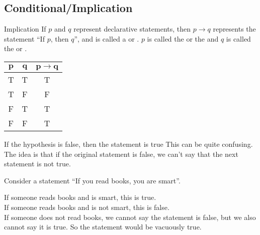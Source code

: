 \documentclass[../notes.tex]{subfiles}
\begin{document}
			\subsection[Conditional]{Conditional/Implication}
				\begin{definition}{Implication}
					If $p$ and $q$ represent declarative statements, then $p \rightarrow q$ represents the statement ``If $p$, then $q$'', and is called a  or . $p$ is called the  or the  and $q$ is called the  or .
				\end{definition}
				\nopagebreak
				\begin{center}
					\begin{tabular}{|c c | c|}
						\hline
						$\mathbf{p}$ & $\mathbf{q}$ & $\mathbf{p \rightarrow q}$\\
						\hline
						T & T & T\\
						T & F & F\\
						F & T & T\\
						F & F & T\\
						\hline
					\end{tabular}	
				\end{center}
				\nopagebreak
				\begin{sidenote}{If the hypothesis is false, then the statement is true}
					This can be quite confusing. The idea is that if the original statement is false, we can't say that the next statement is not true.
					\begin{example}
						Consider a statement ``If you read books, you are smart''.
						\begin{indentparagraph}
							If someone reads books and is smart, this is true.\\
							If someone reads books and is not smart, this is false.\\
							If someone does not read books, we cannot say the statement is false, but we also cannot say it is true. So the statement would be vacuously true.
						\end{indentparagraph}
					\end{example} 
				\end{sidenote}
\end{document}
